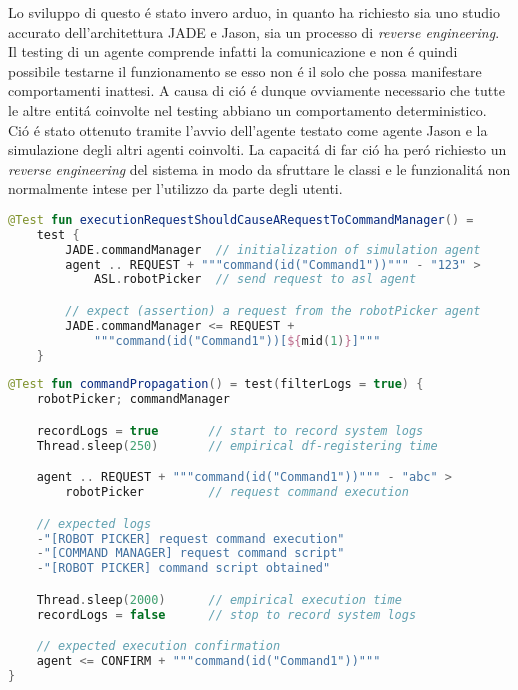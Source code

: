 Lo sviluppo di questo \'e stato invero arduo, in quanto ha richiesto sia uno studio accurato dell'architettura JADE e Jason, sia un processo di \textit{reverse engineering}. Il testing di un agente comprende infatti la comunicazione e non \'e quindi possibile testarne il funzionamento se esso non \'e il solo che possa manifestare comportamenti inattesi. A causa di ci\'o \'e dunque ovviamente necessario che tutte le altre entit\'a coinvolte nel testing abbiano un comportamento deterministico. Ci\'o \'e stato ottenuto tramite l'avvio dell'agente testato come agente Jason e la simulazione degli altri agenti coinvolti. La capacit\'a di far ci\'o ha per\'o richiesto un \textit{reverse engineering} del sistema in modo da sfruttare le classi e le funzionalit\'a non normalmente intese per l'utilizzo da parte degli utenti.

\begin{lstlisting}[language=Kotlin, caption=Esempio di test `basato sulla comunicazione' permesso dall'utilizzo del framework., label=listing:communication-testing]
@Test fun executionRequestShouldCauseARequestToCommandManager() = 
    test {
        JADE.commandManager  // initialization of simulation agent
        agent .. REQUEST + """command(id("Command1"))""" - "123" >
            ASL.robotPicker  // send request to asl agent

        // expect (assertion) a request from the robotPicker agent
        JADE.commandManager <= REQUEST +
            """command(id("Command1"))[${mid(1)}]"""
    }
\end{lstlisting}

\begin{lstlisting}[language=Kotlin, caption=Esempio di test `basato sul logging' permesso dall'utilizzo del framework., label=listing:logging-testing]
@Test fun commandPropagation() = test(filterLogs = true) {
    robotPicker; commandManager

    recordLogs = true       // start to record system logs
    Thread.sleep(250)       // empirical df-registering time

    agent .. REQUEST + """command(id("Command1"))""" - "abc" >
        robotPicker         // request command execution

    // expected logs
    -"[ROBOT PICKER] request command execution"
    -"[COMMAND MANAGER] request command script"
    -"[ROBOT PICKER] command script obtained"

    Thread.sleep(2000)      // empirical execution time
    recordLogs = false      // stop to record system logs

    // expected execution confirmation
    agent <= CONFIRM + """command(id("Command1"))"""
}
\end{lstlisting}
